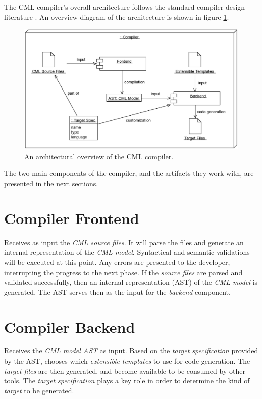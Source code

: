 The CML compiler's overall architecture follows the standard compiler design literature \cite{torben}. An overview diagram of the architecture is shown in figure \ref{fig:overview}.

\begin{figure}
\centering
\includegraphics[width=\textwidth]{compiler/figure-overview}
\caption{An architectural overview of the CML compiler.}
\label{fig:overview}
\end{figure}

The two main components of the compiler,
and the artifacts they work with,
are presented in the next sections.

\section[Frontend]{Compiler Frontend}

Receives as input the \emph{CML source files}.
It will parse the files and generate an internal representation of the \emph{CML model}.
Syntactical and semantic validations will be executed at this point.
Any errors are presented to the developer, interrupting the progress to the next phase.
If the \emph{source files} are parsed and validated successfully, then an internal representation (AST) of the \emph{CML model} is generated.
The AST serves then as the input for the \emph{backend} component.

\section[Backend]{Compiler Backend}

Receives the \emph{CML model AST} as input.
Based on the \emph{target specification} provided by the AST, chooses which \emph{extensible templates} to use for code generation.
The \emph{target files} are then generated, and become available to be consumed by other tools. The \emph{target specification} plays a key role in order to determine the kind of \emph{target} to be generated.

